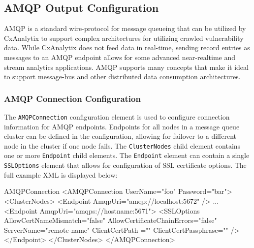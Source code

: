 \subsection{AMQP Output Configuration}\label{sec:amqp_config}

AMQP is a standard wire-protocol for message queueing that can be utilized by CxAnalytix to support complex architectures for utilizing crawled 
vulnerability data.  While CxAnalytix does not feed data in real-time, sending record entries as messages to an AMQP endpoint allows for some
advanced near-realtime and stream analytics applications.  AMQP supports many concepts that make it ideal to support message-bus and other
distributed data consumption architectures.




\subsubsection{AMQP Connection Configuration}

The \texttt{AMQPConnection} configuration element is used to configure connection information for AMQP endpoints.  Endpoints for all nodes in a message queue cluster
can be defined in the configuration, allowing for failover to a different node in the cluster if one node fails.  The \texttt{ClusterNodes} child element
contains one or more \texttt{Endpoint} child elements.  The \texttt{Endpoint} element can contain a single \texttt{SSLOptions} element that allows
for configuration of SSL certificate options.  The full example XML is displayed below:\\


\begin{xml}{AMQPConnection}{\expandsenv\encrypts}{}
<AMQPConnection UserName="foo" Password="bar">
    <ClusterNodes>
        <Endpoint 
            AmqpUri="amqp://localhost:5672" 
            />
        ...
        <Endpoint 
            AmqpUri="amqps://hostname:5671">
            <SSLOptions 
                AllowCertNameMismatch="false" 
                AllowCertificateChainErrors="false" 
                ServerName="remote-name" 
                ClientCertPath ="" 
                ClientCertPassphrase=""
                />
        </Endpoint>
    </ClusterNodes>
</AMQPConnection>
\end{xml}


